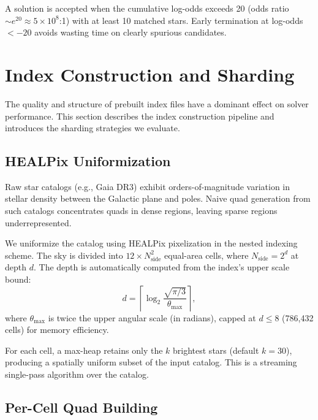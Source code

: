 \documentclass[twocolumn, 10pt]{article}
\begin{document}
A solution is accepted when the cumulative log-odds exceeds 20 (odds
ratio $\sim e^{20} \approx 5 \times 10^8$:1) with at least 10 matched
stars. Early termination at log-odds $< -20$ avoids wasting time on
clearly spurious candidates.

\section{Index Construction and Sharding} \label{sec:indexing}

The quality and structure of prebuilt index files have a dominant effect
on solver performance. This section describes the index construction
pipeline and introduces the sharding strategies we evaluate.

\subsection{HEALPix Uniformization} \label{sec:healpix}

Raw star catalogs (e.g., Gaia DR3) exhibit orders-of-magnitude variation
in stellar density between the Galactic plane and poles. Naive quad
generation from such catalogs concentrates quads in dense regions, leaving
sparse regions underrepresented.

We uniformize the catalog using HEALPix \citep{gorski2005} pixelization in the
nested indexing scheme. The sky is divided into $12 \times N_{\text{side}}^2$
equal-area cells, where $N_{\text{side}} = 2^d$ at depth $d$. The depth
is automatically computed from the index's upper scale bound:
\begin{equation}
    d = \left\lceil \log_2 \frac{\sqrt{\pi/3}}{\theta_{\max}} \right\rceil,
\end{equation}
where $\theta_{\max}$ is twice the upper angular scale (in radians),
capped at $d \leq 8$ (786{,}432 cells) for memory efficiency.

For each cell, a max-heap retains only the $k$ brightest stars (default
$k = 30$), producing a spatially uniform subset of the input catalog.
This is a streaming single-pass algorithm over the catalog.

\subsection{Per-Cell Quad Building} \label{sec:percell}
\end{document}
